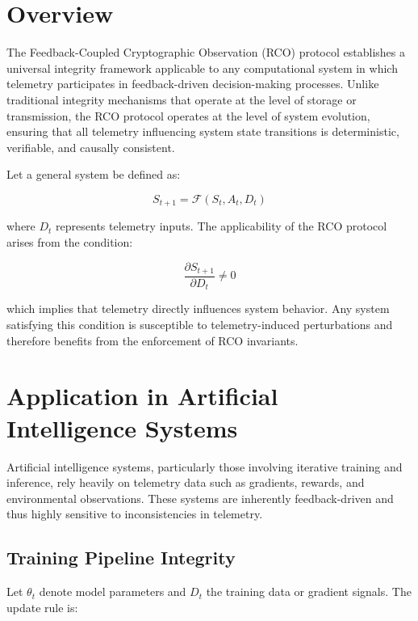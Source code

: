 \section{Overview}

The Feedback-Coupled Cryptographic Observation (RCO) protocol establishes a universal integrity framework applicable to any computational system in which telemetry participates in feedback-driven decision-making processes. Unlike traditional integrity mechanisms that operate at the level of storage or transmission, the RCO protocol operates at the level of system evolution, ensuring that all telemetry influencing system state transitions is deterministic, verifiable, and causally consistent.

Let a general system be defined as:

\begin{equation}
S_{t+1} = \mathcal{F}(S_t, A_t, D_t)
\end{equation}

where $D_t$ represents telemetry inputs. The applicability of the RCO protocol arises from the condition:

\begin{equation}
\frac{\partial S_{t+1}}{\partial D_t} \neq 0
\end{equation}

which implies that telemetry directly influences system behavior. Any system satisfying this condition is susceptible to telemetry-induced perturbations and therefore benefits from the enforcement of RCO invariants.

\section{Application in Artificial Intelligence Systems}

Artificial intelligence systems, particularly those involving iterative training and inference, rely heavily on telemetry data such as gradients, rewards, and environmental observations. These systems are inherently feedback-driven and thus highly sensitive to inconsistencies in telemetry.

\subsection{Training Pipeline Integrity}

Let $\theta_t$ denote model parameters and $D_t$ the training data or gradient signals. The update rule is:

